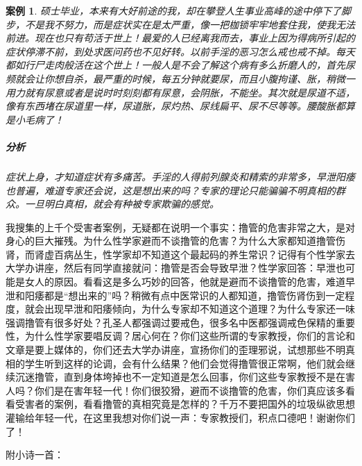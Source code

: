\documentclass{ctexart}
\newtheorem{case}{案例}
\begin{document}
\begin{case}
    硕士毕业，本来有大好前途的我，却在攀登人生事业高峰的途中停下了脚步，不是我不努力，而是症状实在是太严重，像一把枷锁牢牢地套住我，使我无法前进。现在也只有苟活于世上！最爱的人已经离我而去，事业上因为得病所引起的症状停滞不前，到处求医问药也不见好转。以前手淫的恶习怎么戒也戒不掉。每天都如行尸走肉般活在这个世上！一般人是不会了解这个病有多么折磨人的，首先尿频就会让你想自杀，最严重的时候，每五分钟就要尿，而且小腹拘谨、胀，稍微一用力就有尿意或者是说时时刻刻都有尿意，会阴胀，不能坐。其次就是尿道不适，像有东西堵在尿道里一样，尿道胀，尿灼热、尿线扁平、尿不尽等等。腰酸胀都算是小毛病了！
    \subparagraph{分析} 症状上身，才知道症状有多痛苦。手淫的人得前列腺炎和精索的非常多，早泄阳痿也普遍，难道专家还会说，这是想出来的吗？专家的理论只能骗骗不明真相的群众。一旦明白真相，就会有种被专家欺骗的感觉。
\end{case}

我搜集的上千个受害者案例，无疑都在说明一个事实：撸管的危害非常之大，是对身心的巨大摧残。为什么性学家避而不谈撸管的危害？为什么大家都知道撸管伤肾，而肾虚百病丛生，性学家却不知道这个最起码的养生常识？记得有个性学家去大学办讲座，然后有同学直接就问：撸管是否会导致早泄？性学家回答：早泄也可能是女人的原因。看看这是多么巧妙的回答，他就是避而不谈撸管的危害，难道早泄和阳痿都是“想出来的”吗？稍微有点中医常识的人都知道，撸管伤肾伤到一定程度，就会出现早泄和阳痿倾向，为什么专家却不知道这个道理？为什么专家还一味强调撸管有很多好处？孔圣人都强调过要戒色，很多名中医都强调戒色保精的重要性，为什么性学家要唱反调？居心何在？你们这些所谓的专家教授，你们的言论和文章是要上媒体的，你们还去大学办讲座，宣扬你们的歪理邪说，试想那些不明真相的学生听到这样的论调，会有什么结果？他们会觉得撸管很正常啊，他们就会继续沉迷撸管，直到身体垮掉也不一定知道是怎么回事，你们这些专家教授不是在害人吗？你们是在害年轻一代！你们很狡猾，避而不谈撸管的危害，你们真应该多看看受害者的案例，看看撸管的真相究竟是怎样的？千万不要把国外的垃圾纵欲思想灌输给年轻一代，在这里我想对你们说一声：专家教授们，积点口德吧！谢谢你们了！

附小诗一首：
\end{document}
